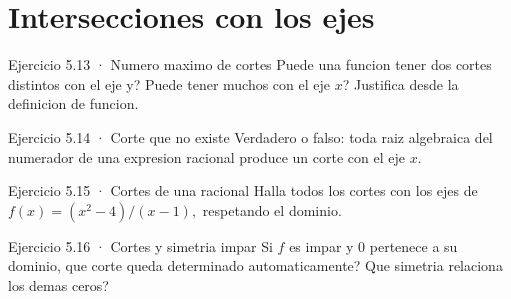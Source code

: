 \documentclass[10pt,a4paper,oneside,openany]{book}
\begin{document}
\section{Intersecciones con los ejes}
\begin{PSevenExerciseFixed}{Ejercicio 5.13 · Numero maximo de cortes}
Puede una funcion tener dos cortes distintos con el eje y? Puede tener muchos con el eje \(x\)? Justifica desde la definicion de funcion.
\end{PSevenExerciseFixed}
\begin{PSevenExerciseFixed}{Ejercicio 5.14 · Corte que no existe}
Verdadero o falso: toda raiz algebraica del numerador de una expresion racional produce un corte con el eje \(x\).
\end{PSevenExerciseFixed}
\begin{PSevenExerciseFixed}{Ejercicio 5.15 · Cortes de una racional}
Halla todos los cortes con los ejes de \(f(x)=(x^{2}-4)/(x-1),\) respetando el dominio.
\end{PSevenExerciseFixed}
\begin{PSevenExerciseFixed}{Ejercicio 5.16 · Cortes y simetria impar}
Si \(f\) es impar y \(0\) pertenece a su dominio, que corte queda determinado automaticamente? Que simetria relaciona los demas ceros?
\end{PSevenExerciseFixed}
\end{document}
